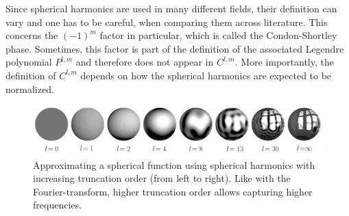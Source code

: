 Since spherical harmonics are used in many different fields, their definition can vary and one has to be careful, when comparing them across literature. This concerns the $(-1)^m$ factor in particular, which is called the Condon-Shortley phase. Sometimes, this factor is part of the definition of the associated Legendre polynomial $P^{l,m}$ and therefore does not appear in $C^{l,m}$. More importantly, the definition of $C^{l,m}$ depends on how the spherical harmonics are expected to be normalized.
\newline
\begin{figure}[h]
\centering
\includegraphics[width=\columnwidth]{04_pn_method/figures/fig_sph_frequencies.pdf}
\caption{Approximating a spherical function using spherical harmonics with increasing truncation order (from left to right). Like with the Fourier-transform, higher truncation order allows capturing higher frequencies.}
\label{fig:sh_vis}
\end{figure}



